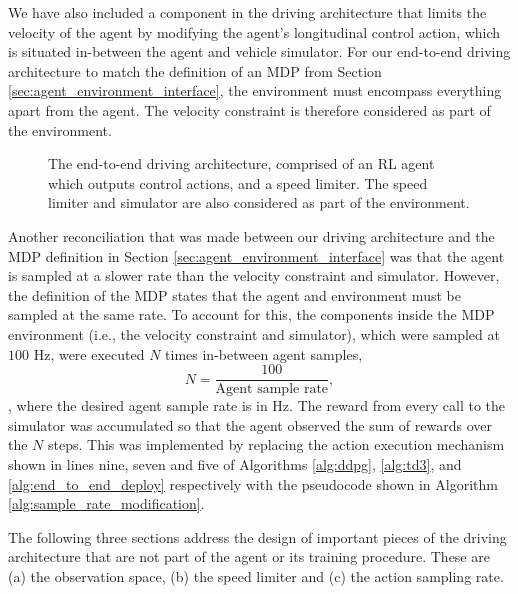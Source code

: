 We have also included a component in the driving architecture that limits the velocity of the agent by modifying the agent's longitudinal control action, which is situated in-between the agent and vehicle simulator. 
For our end-to-end driving architecture to match the definition of an MDP from Section \ref{sec:agent_environment_interface}, the environment must encompass everything apart from the agent.
The velocity constraint is therefore considered as part of the environment.

\begin{figure}[htb!]
    \centering
    
    \caption[The end-to-end driving architecture]{The end-to-end driving architecture, comprised of an RL agent which outputs control actions, and a speed limiter. The speed limiter and simulator are also considered as part of the environment.}
    \label{fig:end_to_end_architecture}
\end{figure}

Another reconciliation that was made between our driving architecture and the MDP definition in Section \ref{sec:agent_environment_interface} was that the agent is sampled at a slower rate than the velocity constraint and simulator.
However, the definition of the MDP states that the agent and environment must be sampled at the same rate.
To account for this, the components inside the MDP environment (i.e., the velocity constraint and simulator), which were sampled at $100$ Hz, were executed $N$ times in-between agent samples,
\begin{equation}
    N = \frac{100}{\text{Agent sample rate}},
\label{eq:N}
\end{equation}
, where the desired agent sample rate is in Hz.
The reward from every call to the simulator was accumulated so that the agent observed the sum of rewards over the $N$ steps.
This was implemented by replacing the action execution mechanism shown in lines nine, seven and five of Algorithms \ref{alg:ddpg}, \ref{alg:td3}, and \ref{alg:end_to_end_deploy} respectively with the pseudocode shown in Algorithm \ref{alg:sample_rate_modification}.



The following three sections address the design of important pieces of the driving architecture that are not part of the agent or its training procedure.
These are (a) the observation space, (b) the speed limiter and (c) the action sampling rate.


